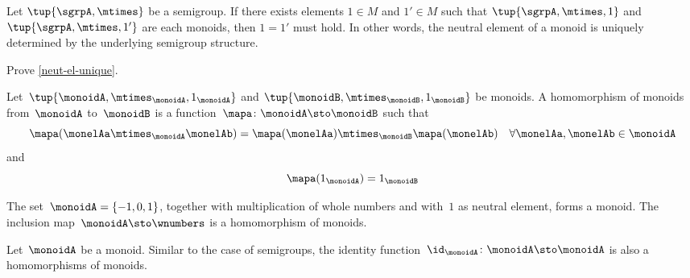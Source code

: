 \begin{lemma}
  \label{neut-el-unique}
  Let $\tup{\sgrpA, \mtimes}$ be a semigroup. If there exists elements $1 \in M$ and $1' \in M$ such that $\tup{\sgrpA, \mtimes, 1}$ and $\tup{\sgrpA, \mtimes, 1'}$ are each monoids, then $1 = 1'$ must hold. In other words, the neutral element of a monoid is uniquely determined by the underlying semigroup structure.
\end{lemma}

\begin{exercise}
  Prove \cref{neut-el-unique}.
\end{exercise}
\begin{solution}
\end{solution}
\begin{definition}
  \label{def:monoid-mor}
  Let~$\tup{\monoidA, \mtimes_\monoidA, 1_\monoidA}$ and $\tup{\monoidB, \mtimes_\monoidB, 1_\monoidB}$ be monoids.
  A homomorphism of monoids from~$\monoidA$ to~$\monoidB$ is a function~$\mapa \colon \monoidA \sto \monoidB$ such that
  \begin{equation}
    \label{mon-mor-comp}
    \mapa (\monelAa \mtimes_{\monoidA} \monelAb) = \mapa (\monelAa) \mtimes_{\monoidB}  \mapa(\monelAb) \quad \forall \monelAa, \monelAb \in \monoidA
  \end{equation}
  and
  \begin{equation}
    \label{mon-id-comp}
    \mapa (1_\monoidA) = 1_{\monoidB}
  \end{equation}
\end{definition}

\begin{example}
  The set~$\monoidA = \{ -1, 0, 1 \}$, together with multiplication of whole numbers and with~$1$ as neutral element, forms a monoid. The inclusion map~$\monoidA \sto \wnumbers$ is a homomorphism of monoids.
\end{example}



\begin{definition}
  \label{def:identity-mon-mor}
  Let~$\monoidA$ be a monoid. Similar to the case of semigroups, the identity function~$\id_\monoidA\colon \monoidA \sto \monoidA$ is also a homomorphisms of monoids.
\end{definition}



